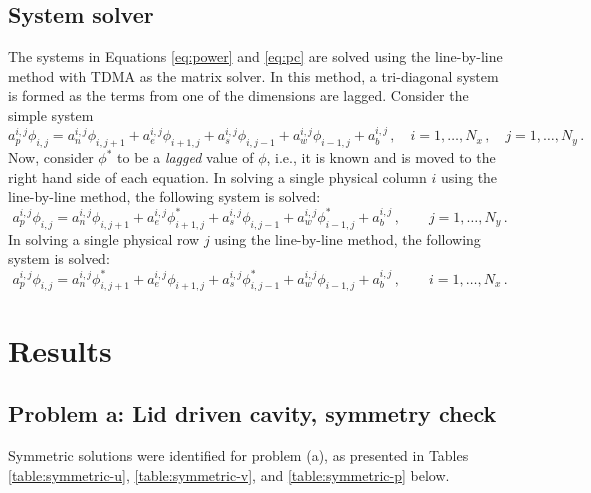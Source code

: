 \documentclass{article}
\begin{document}
\subsection{System solver}

The systems in Equations  \eqref{eq:power} and \eqref{eq:pc} are solved using the line-by-line method with TDMA as the matrix solver. In this method, a tri-diagonal system is formed as the terms from one of the dimensions are lagged. Consider the simple system
\begin{equation}
	a_p^{i,j} \phi_{i,j} = a_n^{i,j} \phi_{i,j+1} + a_e^{i,j} \phi_{i+1,j} + a_s^{i,j} \phi_{i,j-1} + a_w^{i,j} \phi_{i-1,j} + a_b^{i,j}\,, \quad i = 1, \ldots, N_x\,, \quad j = 1, \ldots, N_y\,.
\end{equation}
Now, consider $\phi^*$ to be a \textit{lagged} value of $\phi$, i.e., it is known and is moved to the right hand side of each equation. In solving a single physical column $i$ using the line-by-line method, the following system is solved:
\begin{equation}
	a_p^{i,j} \phi_{i,j} = a_n^{i,j} \phi_{i,j+1} + a_e^{i,j} \phi^*_{i+1,j} + a_s^{i,j} \phi_{i,j-1} + a_w^{i,j} \phi^*_{i-1,j} + a_b^{i,j}\,, \quad \quad j = 1, \ldots, N_y\,.
\end{equation}
In solving a single physical row $j$ using the line-by-line method, the following system is solved:
\begin{equation}
	a_p^{i,j} \phi_{i,j} = a_n^{i,j} \phi^*_{i,j+1} + a_e^{i,j} \phi_{i+1,j} + a_s^{i,j} \phi^*_{i,j-1} + a_w^{i,j} \phi_{i-1,j} + a_b^{i,j}\,, \quad \quad i = 1, \ldots, N_x\,.
\end{equation}

\section{Results}

\subsection{Problem a: Lid driven cavity, symmetry check}

Symmetric solutions were identified for problem (a), as presented in Tables \ref{table:symmetric-u}, \ref{table:symmetric-v}, and \ref{table:symmetric-p} below.
\end{document}
